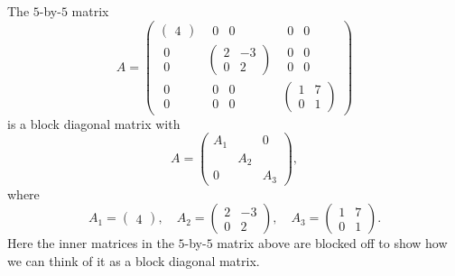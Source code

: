 \begin{example}\label{ax:8.36}
The $5$-by-$5$ matrix
\[ A = \begin{pmatrix}
  \begin{pmatrix} 4 \end{pmatrix} & \begin{matrix} 0 & 0 \end{matrix}
    & \begin{matrix} 0 & 0 \end{matrix}\\
  \begin{matrix} 0\\ 0 \end{matrix}
    & \begin{pmatrix} 2 & -3\\ 0 & 2 \end{pmatrix}
    & \begin{matrix} 0 & 0\\ 0 & 0 \end{matrix}\\
  \begin{matrix} 0\\ 0 \end{matrix}
    & \begin{matrix} 0 & 0\\ 0 & 0 \end{matrix}
    & \begin{pmatrix} 1 & 7\\ 0 & 1 \end{pmatrix}
\end{pmatrix} \]
is a block diagonal matrix with
\[ A = \begin{pmatrix} A_1 & & 0\\ & A_2 & \\ 0 & & A_3 \end{pmatrix}, \]
where
\[ A_1 = \begin{pmatrix} 4 \end{pmatrix}, \quad
   A_2 = \begin{pmatrix} 2 & -3\\ 0 & 2 \end{pmatrix}, \quad
   A_3 = \begin{pmatrix} 1 & 7\\ 0 & 1 \end{pmatrix}. \]
Here the inner matrices in the $5$-by-$5$ matrix above are blocked off to show
how we can think of it as a block diagonal matrix.
\end{example}

